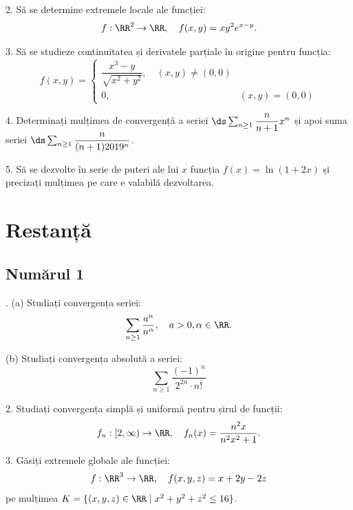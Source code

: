 \vspace{1cm}

2. Să se determine extremele locale ale funcției:
\[
  f : \RR^2 \to \RR, \quad f(x, y) = xy^2 e^{x-y}.
\]

\vspace{1cm}

3. Să se studieze continuitatea și derivatele parțiale în origine pentru funcția:
\[
  f(x, y) = %
  \begin{cases}
    \dfrac{x^3 - y}{\sqrt{x^2 + y^2}}, \quad (x, y) \neq (0, 0) \\
    0, & (x, y) = (0, 0)
  \end{cases}
\]

\vspace{1cm}

4. Determinați mulțimea de convergență a seriei $ \ds\sum_{n \geq 1} \dfrac{n}{n+1}x^n $
și apoi suma seriei $ \ds\sum_{n \geq 1} \dfrac{n}{(n+1)2019^n} $.

\vspace{1cm}

5. Să se dezvolte în serie de puteri ale lui $ x $ funcția $ f(x) = \ln(1 + 2x) $
și precizați mulțimea pe care e valabilă dezvoltarea.


\section{Restanță}

\subsection{Numărul 1}

\indent{}. (a) Studiați convergența seriei:
\[
  \sum_{n \geq 1} \dfrac{a^n}{n^\alpha}, \quad a > 0, \alpha \in \RR.
\]

(b) Studiați convergența absolută a seriei:
\[
  \sum_{n \geq 1} \dfrac{(-1)^n}{2^{2n} \cdot n!}
\]

\vspace{1cm}

2. Studiați convergența simplă și uniformă pentru șirul de funcții:
\[
  f_n : [2, \infty) \to \RR, \quad f_n(x) = \dfrac{n^2 x}{n^2x^2 + 1}.
\]

\vspace{1cm}

3. Găsiți extremele globale ale funcției:
\[
  f: \RR^3 \to \RR, \quad f(x, y, z) = x + 2y - 2z
\]
pe mulțimea $ K = \{(x, y, z) \in \RR \mid x^2 + y^2 + z^2 \leq 16 \} $.

